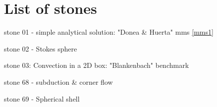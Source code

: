 \section{List of stones} %


{\small 

\noindent stone 01 - simple analytical solution: "Donea \& Huerta" mms \ref{mms1} 


\noindent stone 02 - Stokes sphere 


\noindent stone 03: Convection in a 2D box: "Blankenbach" benchmark \cite{blbc89}


\noindent stone 68 - subduction \& corner flow


\noindent stone 69 - Spherical shell 


}




